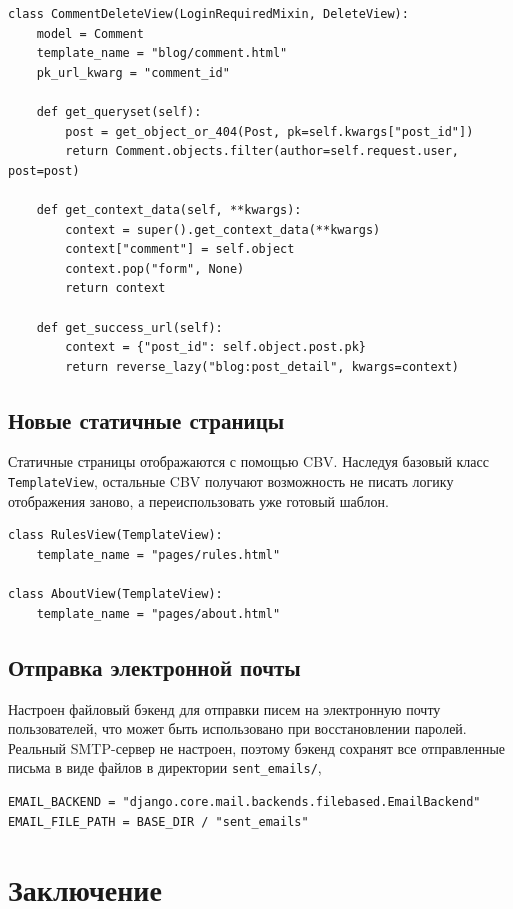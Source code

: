 \documentclass[bachelor, och, pract]{SCWorks}
\begin{document}
\begin{lstlisting}
class CommentDeleteView(LoginRequiredMixin, DeleteView):
    model = Comment
    template_name = "blog/comment.html"
    pk_url_kwarg = "comment_id"

    def get_queryset(self):
        post = get_object_or_404(Post, pk=self.kwargs["post_id"])
        return Comment.objects.filter(author=self.request.user, post=post)

    def get_context_data(self, **kwargs):
        context = super().get_context_data(**kwargs)
        context["comment"] = self.object
        context.pop("form", None)
        return context

    def get_success_url(self):
        context = {"post_id": self.object.post.pk}
        return reverse_lazy("blog:post_detail", kwargs=context)
\end{lstlisting}

\newpage
\subsection{Новые статичные страницы}

Статичные страницы отображаются с помощью CBV.
Наследуя базовый класс \texttt{TemplateView}, остальные CBV получают возможность не писать логику отображения заново, а переиспользовать уже готовый шаблон.

\begin{lstlisting}
class RulesView(TemplateView):
    template_name = "pages/rules.html"

class AboutView(TemplateView):
    template_name = "pages/about.html"
\end{lstlisting}

\subsection{Отправка электронной почты}

Настроен файловый бэкенд для отправки писем на электронную почту пользователей, что может быть использовано при восстановлении паролей.
Реальный SMTP-сервер не настроен, поэтому бэкенд сохранят все отправленные письма в виде файлов в директории \texttt{sent\_emails/},

\begin{lstlisting}
EMAIL_BACKEND = "django.core.mail.backends.filebased.EmailBackend"
EMAIL_FILE_PATH = BASE_DIR / "sent_emails"
\end{lstlisting}


\newpage
\section{Заключение}
\end{document}
